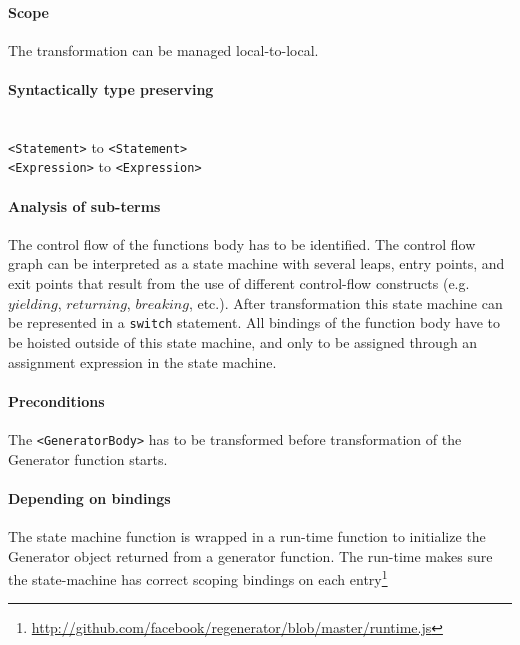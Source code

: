 \paragraph{Scope}
The transformation can be managed local-to-local.

\paragraph{Syntactically type preserving} \mbox{}\\
\lstinline$<Statement>$ to \lstinline$<Statement>$ \\
\lstinline$<Expression>$ to \lstinline$<Expression>$

\paragraph{Analysis of sub-terms}
The control flow of the functions body has to be identified. The control flow graph can be interpreted as a state machine with several leaps, entry points, and exit points that result from the use of different control-flow constructs (e.g. $yielding$, $returning$, $breaking$, etc.). After transformation this state machine can be represented in a \lstinline$switch$ statement. All bindings of the function body have to be hoisted outside of this state machine, and only to be assigned through an assignment expression in the state machine.

\paragraph{Preconditions}
The \lstinline$<GeneratorBody>$ has to be transformed before transformation of the Generator function starts.

\paragraph{Depending on bindings}
The state machine function is wrapped in a run-time function to initialize the Generator object returned from a generator function. The run-time makes sure the state-machine has correct scoping bindings on each entry\footnote{\url{http://github.com/facebook/regenerator/blob/master/runtime.js}}

